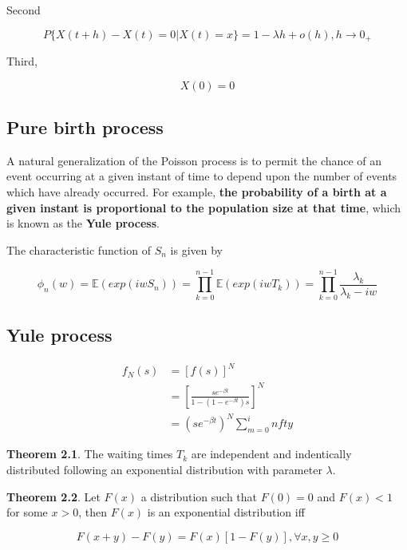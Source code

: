 \documentclass[12pt]{article}
\theoremstyle{nonumberbreak}
\begin{document}
Second


$$
P\{ X(t+h) - X(t) = 0 | X(t) = x \} = 1 - \lambda h + o(h), h \to 0_+
$$


Third,

$$
X(0) = 0 
$$


\subsection{Pure birth process}

A natural generalization of the Poisson process is to permit the chance of
an event occurring at a given instant of time to depend upon the number of events which have already occurred. For example, \textbf{the probability of a birth at a given instant is proportional to the population size at that time}, which is known as the \textbf{Yule process}.




The characteristic function of $S_n$ is given by

$$
\phi_n(w) = \mathbb{E}(exp(iwS_n)) = \prod_{k=0}^{n-1} \mathbb{E}(exp(iw T_k)) = \prod_{k=0}^{n-1} \frac{\lambda_k}{\lambda_k - iw}
$$


\subsection{Yule process}



$$
\begin{aligned}
f_N(s) &= [f(s)]^N \\[8pt]
&= \left[ \frac{se^{-\beta t}}{1 - (1-e^{-\beta t})s} \right]^N \\[8pt]
&= (s e^{-\beta t})^N \sum_{m=0}^infty 
\end{aligned}
$$




\begin{theorem}
\textbf{Theorem 2.1}. The waiting times $T_k$ are independent and indentically distributed following an exponential distribution with parameter $\lambda$. 
\end{theorem}



\begin{theorem}
\textbf{Theorem 2.2}. Let $F(x)$ a distribution such that $F(0) = 0$ and $F(x) < 1$ for some $x >0 $, then $F(x)$ is an exponential distribution iff

$$
F(x+y) - F(y) = F(x)[1-F(y)], \forall x,y \ge 0
$$
\end{theorem}
\end{document}
